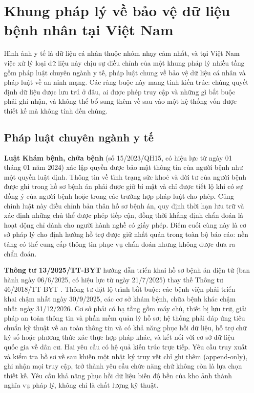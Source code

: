\section{Khung pháp lý về bảo vệ dữ liệu bệnh nhân tại Việt Nam}
\label{sec:legal}

Hình ảnh y tế là dữ liệu cá nhân thuộc nhóm nhạy cảm nhất, và tại Việt Nam việc
xử lý loại dữ liệu này chịu sự điều chỉnh của một khung pháp lý nhiều tầng gồm
pháp luật chuyên ngành y tế, pháp luật chung về bảo vệ dữ liệu cá nhân và pháp
luật về an ninh mạng. Các ràng buộc này mang tính kiến trúc: chúng quyết định
dữ liệu được lưu trú ở đâu, ai được phép truy cập và những gì bắt buộc phải ghi
nhận, và không thể bổ sung thêm về sau vào một hệ thống vốn được thiết kế mà
không tính đến chúng.

\subsection{Pháp luật chuyên ngành y tế}

\textbf{Luật Khám bệnh, chữa bệnh} (số 15/2023/QH15, có hiệu lực từ ngày 01
tháng 01 năm 2024) \cite{lawmet2023} xác lập quyền được bảo mật thông tin của người bệnh như một
quyền luật định. Thông tin về tình trạng sức khoẻ và đời tư của người bệnh được
ghi trong hồ sơ bệnh án phải được giữ bí mật và chỉ được tiết lộ khi có sự đồng
ý của người bệnh hoặc trong các trường hợp pháp luật cho phép. Cũng chính luật
này điều chỉnh bản thân hồ sơ bệnh án, quy định thời hạn lưu trữ và xác định
những chủ thể được phép tiếp cận, đồng thời khẳng định chẩn đoán là hoạt động
chỉ dành cho người hành nghề có giấy phép. Điểm cuối cùng này là cơ sở pháp lý
cho định hướng hỗ trợ được giữ nhất quán trong toàn bộ báo cáo: nền tảng có thể
cung cấp thông tin phục vụ chẩn đoán nhưng không được đưa ra chẩn đoán.

\textbf{Thông tư 13/2025/TT-BYT} hướng dẫn triển khai hồ sơ bệnh án điện tử
(ban hành ngày 06/6/2025, có hiệu lực từ ngày 21/7/2025) thay thế Thông tư
46/2018/TT-BYT \cite{tt13_2025,mohemr}. Thông tư đặt lộ trình bắt buộc: các bệnh
viện phải triển khai chậm nhất ngày 30/9/2025, các cơ sở khám bệnh, chữa bệnh khác
chậm nhất ngày 31/12/2026. Cơ sở phải có hạ tầng gồm máy chủ, thiết bị lưu trữ,
giải pháp an toàn thông tin và phần mềm quản lý hồ sơ; hệ thống phải đáp ứng tiêu
chuẩn kỹ thuật về an toàn thông tin và có khả năng phục hồi dữ liệu, hỗ trợ chữ ký
số hoặc phương thức xác thực hợp pháp khác, và kết nối với cơ sở dữ liệu quốc gia
về dân cư. Hai yêu cầu có hệ quả kiến trúc trực tiếp. Yêu cầu truy xuất và kiểm tra
hồ sơ về sau khiến một nhật ký truy vết chỉ ghi thêm (append-only), ghi nhận mọi
truy cập, trở thành yêu cầu chức năng chứ không còn là lựa chọn thiết kế. Yêu cầu
khả năng phục hồi dữ liệu biến độ bền của kho ảnh thành nghĩa vụ pháp lý, không
chỉ là chất lượng kỹ thuật.

